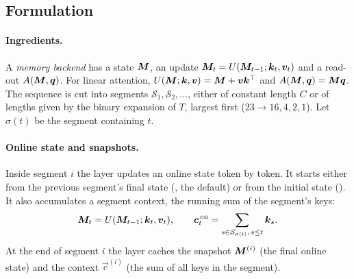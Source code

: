 \subsection{Formulation}\label{sec:c13-mc-form}

\paragraph{Ingredients.} A \emph{memory backend} has a state $\bm{M}$, an update
$\bm{M}_t=U(\bm{M}_{t-1};\bm{k}_t,\bm{v}_t)$ and a read-out $A(\bm{M},\bm{q})$. For linear attention,
$U(\bm{M};\bm{k},\bm{v})=\bm{M}+\bm{v}\bm{k}^{\top}$ and $A(\bm{M},\bm{q})=\bm{M}\bm{q}$. The sequence is cut into segments
$\mathcal{S}_1,\mathcal{S}_2,\dots$, either of constant length $C$ or of lengths given by the binary
expansion of $T$, largest first ($23\to16,4,2,1$). Let $\sigma(t)$ be the segment containing $t$.

\paragraph{Online state and snapshots.} Inside segment $i$ the layer updates an online state token by
token. It starts either from the previous segment's final state (, the default) or
from the initial state (). It also accumulates a segment context, the running sum of the
segment's keys:
\begin{equation}\label{eq:c13-mc-online}
  \bm{M}_t = U(\bm{M}_{t-1};\bm{k}_t,\bm{v}_t),\qquad \bm{c}^{\,\mathrm{on}}_t=\sum_{s\in\mathcal{S}_{\sigma(t)},\,s\le t}\bm{k}_s .
\end{equation}
At the end of segment $i$ the layer caches the snapshot $\bm{M}^{(i)}$ (the final online state) and the
context $\vec{c}^{(i)}$ (the sum of all keys in the segment).

